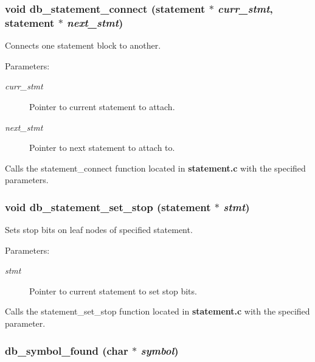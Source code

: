 \subsubsection{\setlength{\rightskip}{0pt plus 5cm}void db\_\-statement\_\-connect ({\bf statement} $\ast$ {\em curr\_\-stmt}, {\bf statement} $\ast$ {\em next\_\-stmt})}\label{db_8c_a25}


Connects one statement block to another.

\begin{Desc}
\item[Parameters: ]\par
\begin{description}
\item[{\em 
curr\_\-stmt}]Pointer to current statement to attach. \item[{\em 
next\_\-stmt}]Pointer to next statement to attach to.\end{description}
\end{Desc}
Calls the statement\_\-connect function located in {\bf statement.c} with the specified parameters. 
\subsubsection{\setlength{\rightskip}{0pt plus 5cm}void db\_\-statement\_\-set\_\-stop ({\bf statement} $\ast$ {\em stmt})}\label{db_8c_a26}


Sets stop bits on leaf nodes of specified statement.

\begin{Desc}
\item[Parameters: ]\par
\begin{description}
\item[{\em 
stmt}]Pointer to current statement to set stop bits.\end{description}
\end{Desc}
Calls the statement\_\-set\_\-stop function located in {\bf statement.c} with the specified parameter. 
\subsubsection{ db\_\-symbol\_\-found (char $\ast$ {\em symbol})}\label{db_8c_a30}


